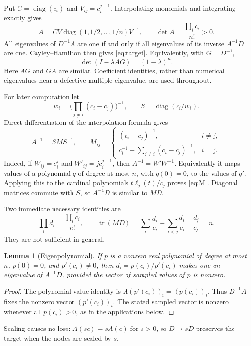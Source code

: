 \documentclass[11pt]{article}
\newtheorem{lemma}[theorem]{Lemma}
\theoremstyle{remark}\newtheorem{remark}[theorem]{Remark}
\DeclareMathOperator{\diag}{diag}\DeclareMathOperator{\tr}{tr}
\begin{document}
Put $C=\diag(c_i)$ and $V_{ij}=c_i^{j-1}$. Interpolating monomials and integrating
exactly gives
\begin{equation}\label{eq:V}
 A=CV\diag(1,1/2,\ldots,1/n)V^{-1},\qquad
 \det A=\frac{\prod_i c_i}{n!}>0.
\end{equation}
All eigenvalues of $D^{-1}A$ are one if and only if all eigenvalues of its
inverse $A^{-1}D$ are one. Cayley--Hamilton then gives \eqref{eq:target}.
Equivalently, with $G=D^{-1}$,
\begin{equation}\label{eq:char}
 \det(I-\lambda AG)=(1-\lambda)^n.
\end{equation}
Here $AG$ and $GA$ are similar. Coefficient identities, rather than numerical
eigenvalues near a defective multiple eigenvalue, are used throughout.

For later computation let
\[
 w_i=\biggl(\prod_{j\ne i}(c_i-c_j)\biggr)^{-1},\qquad
 S=\diag(c_i/w_i).
\]
Direct differentiation of the interpolation formula gives
\begin{equation}\label{eq:M}
 A^{-1}=SMS^{-1},\qquad
 M_{ij}=\begin{cases}
 (c_i-c_j)^{-1},&i\ne j,\\
 c_i^{-1}+\displaystyle\sum_{j\ne i}(c_i-c_j)^{-1},&i=j.
 \end{cases}
\end{equation}
Indeed, if $W_{ij}=c_i^j$ and $W'_{ij}=j c_i^{j-1}$, then
$A^{-1}=W'W^{-1}$. Equivalently it maps values of a polynomial $q$ of degree
at most $n$, with $q(0)=0$, to the values of $q'$.
Applying this to the cardinal polynomials
$t\ell_j(t)/c_j$ proves \eqref{eq:M}. Diagonal matrices commute with $S$, so
$A^{-1}D$ is similar to $MD$.

Two immediate necessary identities are
\begin{equation}\label{eq:traceprod}
 \prod_i d_i=\frac{\prod_i c_i}{n!},\qquad
 \tr(MD)=\sum_i\frac{d_i}{c_i}
       +\sum_{i<j}\frac{d_i-d_j}{c_i-c_j}=n.
\end{equation}
They are not sufficient in general.

\begin{lemma}[Eigenpolynomial]\label{lem:eigen}
If $p$ is a nonzero real polynomial of degree at most $n$, $p(0)=0$, and
$p'(c_i)\ne0$, then $d_i=p(c_i)/p'(c_i)$ makes one an eigenvalue of
$A^{-1}D$, provided the vector of sampled values of $p$ is nonzero.
\end{lemma}
\begin{proof}
The polynomial-value identity is $A(p'(c_i))_i=(p(c_i))_i$.
Thus $D^{-1}A$ fixes the nonzero vector $(p'(c_i))_i$. The stated sampled
vector is nonzero whenever all $p(c_i)>0$, as in the applications below.
\end{proof}
Scaling causes no loss: $A(sc)=sA(c)$ for $s>0$, so $D\mapsto sD$ preserves
the target when the nodes are scaled by $s$.
\end{document}
